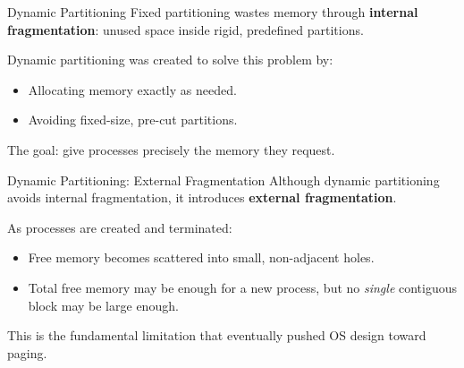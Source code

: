 \documentclass[11pt]{beamer}
\begin{document}

    \begin{frame}[t]{Dynamic Partitioning}
        Fixed partitioning wastes memory through \textbf{internal fragmentation}:
        unused space inside rigid, predefined partitions.

        \medskip

        Dynamic partitioning was created to solve this problem by:
        \begin{itemize}
            \item Allocating memory exactly as needed.
            \item Avoiding fixed-size, pre-cut partitions.
        \end{itemize}

        \medskip
        The goal: give processes precisely the memory they request.
    \end{frame}



    \begin{frame}[t]{Dynamic Partitioning: External Fragmentation}
        Although dynamic partitioning avoids internal fragmentation,
        it introduces \textbf{external fragmentation}.

        \medskip

        As processes are created and terminated:
        \begin{itemize}
            \item Free memory becomes scattered into small, non-adjacent holes.
            \item Total free memory may be enough for a new process, but
            no \emph{single} contiguous block may be large enough.
        \end{itemize}

        \medskip
        This is the fundamental limitation that eventually pushed OS design
        toward paging.
    \end{frame}


\end{document}
